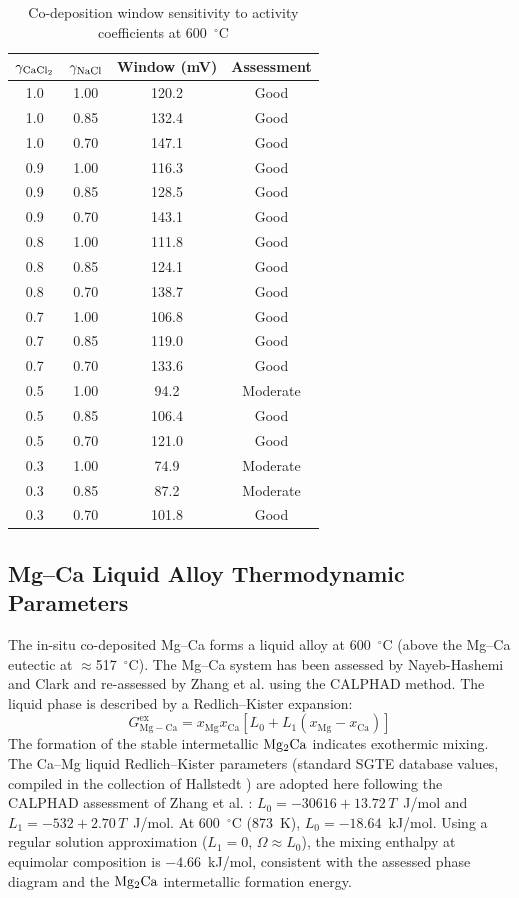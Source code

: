 \documentclass[sn-mathphys,Numbered]{sn-jnl}
\begin{document}
\begin{table}[!ht]
\centering
\footnotesize
\caption{Co-deposition window sensitivity to activity coefficients at 600~$^{\circ}$C}
\label{tab:window_sens}
\begin{tabular}{cccc}
\toprule
$\gamma_{\ce{CaCl2}}$ & $\gamma_{\ce{NaCl}}$ & Window (mV) & Assessment \\
\midrule
1.0 & 1.00 & 120.2 & Good \\
1.0 & 0.85 & 132.4 & Good \\
1.0 & 0.70 & 147.1 & Good \\
0.9 & 1.00 & 116.3 & Good \\
0.9 & 0.85 & 128.5 & Good \\
0.9 & 0.70 & 143.1 & Good \\
0.8 & 1.00 & 111.8 & Good \\
0.8 & 0.85 & 124.1 & Good \\
0.8 & 0.70 & 138.7 & Good \\
0.7 & 1.00 & 106.8 & Good \\
0.7 & 0.85 & 119.0 & Good \\
0.7 & 0.70 & 133.6 & Good \\
0.5 & 1.00 & 94.2 & Moderate \\
0.5 & 0.85 & 106.4 & Good \\
0.5 & 0.70 & 121.0 & Good \\
0.3 & 1.00 & 74.9 & Moderate \\
0.3 & 0.85 & 87.2 & Moderate \\
0.3 & 0.70 & 101.8 & Good \\
\bottomrule
\end{tabular}
\end{table}

\subsection{Mg--Ca Liquid Alloy Thermodynamic Parameters}
\label{subsec:MgCa}

The in-situ co-deposited Mg--Ca forms a liquid alloy at 600~$^{\circ}$C (above the Mg--Ca eutectic at $\approx$517~$^{\circ}$C). The Mg--Ca system has been assessed by Nayeb-Hashemi and Clark \cite{nayeb1988} and re-assessed by Zhang et al. \cite{zhang2008mgce} using the CALPHAD method. The liquid phase is described by a Redlich--Kister expansion:
\begin{equation}
\label{eq:rk}
G^{\mathrm{ex}}_{\mathrm{Mg-Ca}} = x_{\mathrm{Mg}}x_{\mathrm{Ca}}\left[L_0 + L_1(x_{\mathrm{Mg}}-x_{\mathrm{Ca}})\right]
\end{equation}
The formation of the stable intermetallic $\ce{Mg2Ca}$ indicates exothermic mixing. The Ca--Mg liquid Redlich--Kister parameters (standard SGTE database values, compiled in the collection of Hallstedt \cite{hallstedt2025}) are adopted here following the CALPHAD assessment of Zhang et al. \cite{zhang2008mgce}: $L_0 = -30616 + 13.72\,T$~J/mol and $L_1 = -532 + 2.70\,T$~J/mol. At 600~$^{\circ}$C (873~K), $L_0 = -18.64$~kJ/mol. Using a regular solution approximation ($L_1 = 0$, $\Omega \approx L_0$), the mixing enthalpy at equimolar composition is $-4.66$~kJ/mol, consistent with the assessed phase diagram and the $\ce{Mg2Ca}$ intermetallic formation energy.
\end{document}
